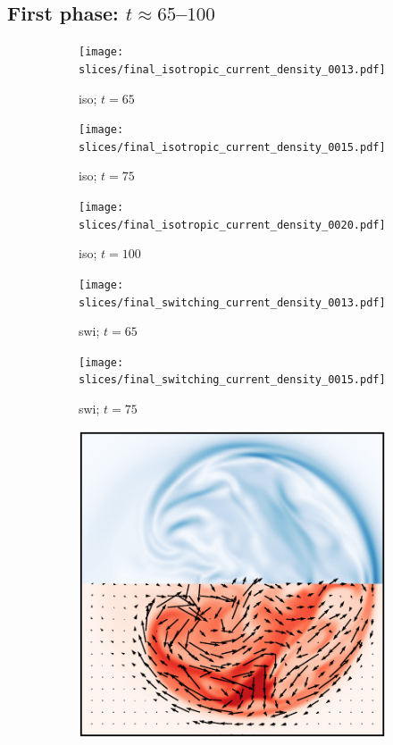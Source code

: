 \subsection{First phase: $t\approx65$--$100$}

\begin{figure}[t]
  \centering
  \begin{subfigure}[t]{0.32\textwidth}
    \centering
    \texttt{[image: slices/final\_isotropic\_current\_density\_0013.pdf]}
    \caption{iso; $t=65$}
    \label{fig:final_isotropic_current_density_0013}
  \end{subfigure}
  \hfill
  \begin{subfigure}[t]{0.32\textwidth}
    \centering
    \texttt{[image: slices/final\_isotropic\_current\_density\_0015.pdf]}
    \caption{iso; $t=75$}
    \label{fig:final_isotropic_current_density_0015}
  \end{subfigure}
  \hfill
  \begin{subfigure}[t]{0.32\textwidth}
    \centering
    \texttt{[image: slices/final\_isotropic\_current\_density\_0020.pdf]}
    \caption{iso; $t=100$}
    \label{fig:final_isotropic_current_density_0020}
  \end{subfigure}
  \hfill
  \begin{subfigure}[t]{0.32\textwidth}
    \centering
    \texttt{[image: slices/final\_switching\_current\_density\_0013.pdf]}
    \caption{swi; $t=65$}
    \label{fig:final_switching_current_density_0013}
  \end{subfigure}
  \hfill
  \begin{subfigure}[t]{0.32\textwidth}
    \centering
    \texttt{[image: slices/final\_switching\_current\_density\_0015.pdf]}
    \caption{swi; $t=75$}
    \label{fig:final_switching_current_density_0015}
  \end{subfigure}
  \hfill
  \begin{subfigure}[t]{0.32\textwidth}
    \centering
    \includegraphics[width=\linewidth]{slices/final_switching_current_density_0020.pdf}

\end{subfigure}
\end{figure}
